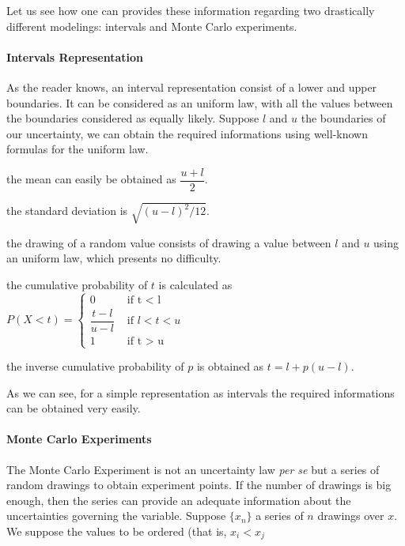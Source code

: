 Let us see how one can provides these information regarding two drastically different modelings: intervals and Monte Carlo experiments.

\paragraph{Intervals Representation}

As the reader knows, an interval representation consist of a lower and upper boundaries. It can be considered as an uniform law, with all the values between the boundaries considered as equally likely. Suppose $l$ and $u$ the boundaries of our uncertainty, we can obtain the required informations using well-known formulas for the uniform law.

\begin{compactitem}
\item the mean can easily be obtained as $\dfrac{u + l}{2}$.
\item the standard deviation is $\sqrt{(u - l)^2 / 12}$.
\item the drawing of a random value consists of drawing a value between $l$ and $u$ using an uniform law, which presents no difficulty.
\item the cumulative probability of $t$ is calculated as $P(X < t) =
			\begin{cases}
				0	&\text{ if t < l}\\
				 \dfrac{t - l }{u - l}	& \text{ if } l < t < u\\
				1	&\text{ if t > u}
			\end{cases}$
\item the inverse cumulative probability of $p$ is obtained as $t = l + p (u - l)$.
\end{compactitem}

As we can see, for a simple representation as intervals the required informations can be obtained very easily.

\paragraph{Monte Carlo Experiments}

The Monte Carlo Experiment is not an uncertainty law \emph{per se} but a series of random drawings to obtain experiment points. If the number of drawings is big enough, then the series can provide an adequate information about the uncertainties governing the variable. Suppose $\{x_n\}$ a series of $n$ drawings over $x$. We suppose the values to be ordered (that is, $x_i < x_j$ 

